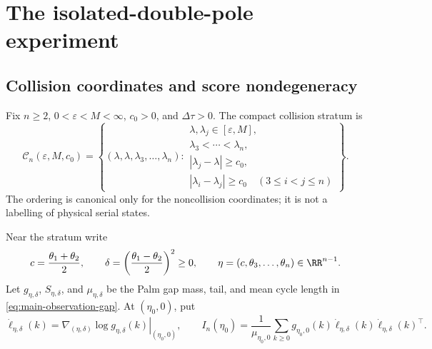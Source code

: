 \section{The isolated-double-pole experiment}
\label{sec:collision-experiment-main}

\subsection{Collision coordinates and score nondegeneracy}

Fix \(n\ge2\), \(0<\varepsilon<M<\infty\), \(c_0>0\), and
\(\Delta\tau>0\).  The compact collision stratum is
\begin{equation}
\mathcal C_n(\varepsilon,M,c_0)=
\left\{(\lambda,\lambda,\lambda_3,\ldots,\lambda_n):
\begin{array}{l}
\lambda,\lambda_j\in[\varepsilon,M],\\
\lambda_3<\cdots<\lambda_n,\\
|\lambda_j-\lambda|\ge c_0,\\
|\lambda_i-\lambda_j|\ge c_0\quad(3\le i<j\le n)
\end{array}\right\}.
\label{eq:main-collision-stratum}
\end{equation}
The ordering is canonical only for the noncollision coordinates; it is not a
labelling of physical serial states.

Near the stratum write
\begin{equation}
 c=\frac{\theta_1+\theta_2}{2},\qquad
 \delta=\left(\frac{\theta_1-\theta_2}{2}\right)^2\ge0,
 \qquad \eta=(c,\theta_3,\ldots,\theta_n)\in\RR^{n-1}.
\label{eq:main-collision-coordinates}
\end{equation}
Let \(g_{\eta,\delta}\), \(S_{\eta,\delta}\), and
\(\mu_{\eta,\delta}\) be the Palm gap mass, tail, and mean cycle length in
\eqref{eq:main-observation-gap}.  At \((\eta_0,0)\), put
\begin{equation}
 \dot\ell_{\eta,\delta}(k)
 =\left.\nabla_{(\eta,\delta)}\log g_{\eta,\delta}(k)
 \right|_{(\eta_0,0)},
\qquad
 I_n(\eta_0)=\frac1{\mu_{\eta_0,0}}
 \sum_{k\ge0}g_{\eta_0,0}(k)
 \dot\ell_{\eta,\delta}(k)\dot\ell_{\eta,\delta}(k)^\top.
\label{eq:main-calendar-information}
\end{equation}

